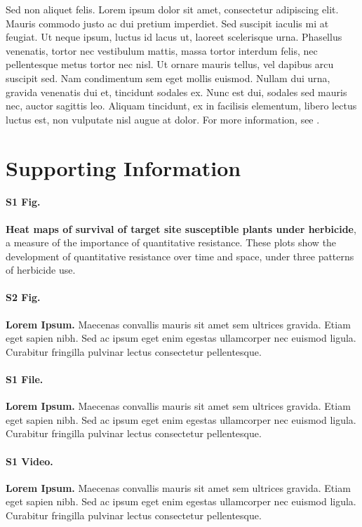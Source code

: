 \documentclass[10pt,letterpaper]{article}
\begin{document}
Sed non aliquet felis. Lorem ipsum dolor sit amet, consectetur adipiscing elit. Mauris commodo justo ac dui pretium imperdiet. Sed suscipit iaculis mi at feugiat. Ut neque ipsum, luctus id lacus ut, laoreet scelerisque urna. Phasellus venenatis, tortor nec vestibulum mattis, massa tortor interdum felis, nec pellentesque metus tortor nec nisl. Ut ornare mauris tellus, vel dapibus arcu suscipit sed. Nam condimentum sem eget mollis euismod. Nullam dui urna, gravida venenatis dui et, tincidunt sodales ex. Nunc est dui, sodales sed mauris nec, auctor sagittis leo. Aliquam tincidunt, ex in facilisis elementum, libero lectus luctus est, non vulputate nisl augue at dolor. For more information, see .

\section*{Supporting Information}

\paragraph*{S1 Fig.}
\label{S1_Fig}
{\bf Heat maps of survival of target site susceptible plants under herbicide}, a measure of the importance of quantitative resistance. These plots show the development of quantitative resistance over time and space, under three patterns of herbicide use.

\paragraph*{S2 Fig.}
\label{S2_Fig}
{\bf Lorem Ipsum.} Maecenas convallis mauris sit amet sem ultrices gravida. Etiam eget sapien nibh. Sed ac ipsum eget enim egestas ullamcorper nec euismod ligula. Curabitur fringilla pulvinar lectus consectetur pellentesque.

\paragraph*{S1 File.}
\label{S1_File}
{\bf Lorem Ipsum.}  Maecenas convallis mauris sit amet sem ultrices gravida. Etiam eget sapien nibh. Sed ac ipsum eget enim egestas ullamcorper nec euismod ligula. Curabitur fringilla pulvinar lectus consectetur pellentesque.

\paragraph*{S1 Video.}
\label{S1_Video}
{\bf Lorem Ipsum.}  Maecenas convallis mauris sit amet sem ultrices gravida. Etiam eget sapien nibh. Sed ac ipsum eget enim egestas ullamcorper nec euismod ligula. Curabitur fringilla pulvinar lectus consectetur pellentesque.
\end{document}
